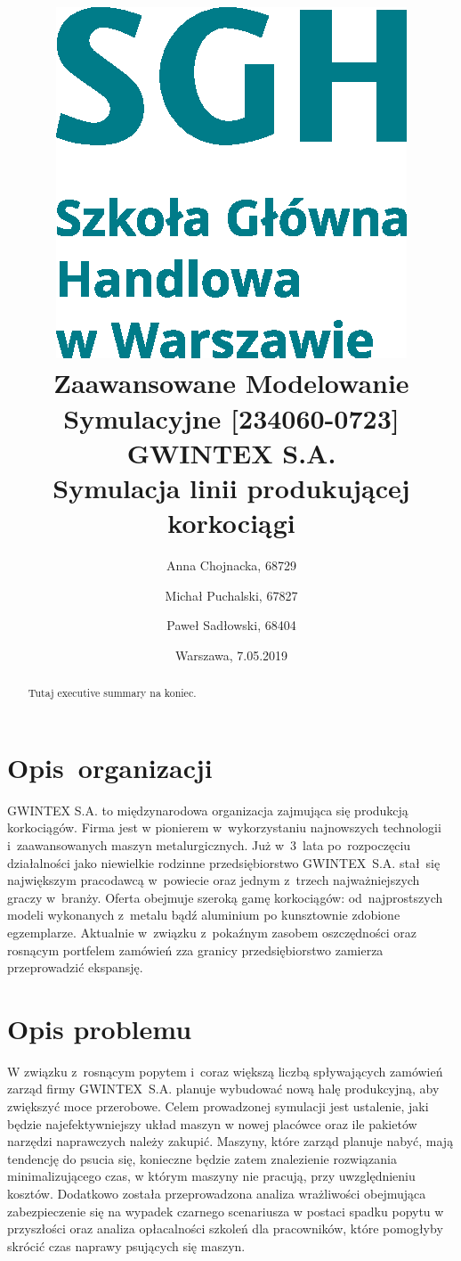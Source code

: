 \documentclass[12pt, a4paper, oneside]{mwart} %
\begin{document}
\title{\includegraphics[width = 0.3 \textwidth]{wykresy/SGHlogotypCMYKpl.eps}\\
\bigskip
Zaawansowane Modelowanie Symulacyjne [234060-0723]\\ 
\bigskip
GWINTEX S.A.\\
Symulacja linii produkującej korkociągi}
\author{Anna Chojnacka, 68729 \and
Michał Puchalski, 67827 \and
Paweł Sadłowski, 68404 }
\date{Warszawa, 7.05.2019}
\maketitle

\pagebreak

\begin{abstract}
Tutaj executive summary na koniec.
\end{abstract}

\pagebreak

\section{Opis~organizacji}
GWINTEX S.A. to międzynarodowa organizacja zajmująca się produkcją korkociągów. Firma jest w pionierem w~wykorzystaniu najnowszych technologii i~zaawansowanych maszyn metalurgicznych. Już w~3~lata po~rozpoczęciu działalności jako niewielkie rodzinne przedsiębiorstwo GWINTEX~S.A. stał~się największym pracodawcą w~powiecie oraz jednym z~trzech najważniejszych graczy w~branży. Oferta obejmuje szeroką gamę korkociągów: od~najprostszych modeli wykonanych z~metalu bądź aluminium po kunsztownie zdobione egzemplarze. Aktualnie w~związku z~pokaźnym zasobem oszczędności oraz rosnącym portfelem zamówień zza granicy przedsiębiorstwo zamierza przeprowadzić ekspansję.

\section{Opis problemu}
W związku z~rosnącym popytem i~coraz większą liczbą spływających zamówień zarząd firmy GWINTEX~S.A. planuje wybudować nową halę produkcyjną, aby zwiększyć moce przerobowe. Celem prowadzonej symulacji jest ustalenie, jaki będzie najefektywniejszy układ maszyn w nowej placówce oraz ile pakietów narzędzi naprawczych należy zakupić. Maszyny, które zarząd planuje nabyć, mają tendencję do psucia się, konieczne będzie zatem znalezienie rozwiązania minimalizującego czas, w którym maszyny nie pracują, przy uwzględnieniu kosztów. Dodatkowo została przeprowadzona analiza wrażliwości obejmująca zabezpieczenie się na wypadek czarnego scenariusza w postaci spadku popytu w przyszłości oraz analiza opłacalności szkoleń dla pracowników, które pomogłyby skrócić czas naprawy psujących się maszyn.
\end{document}
